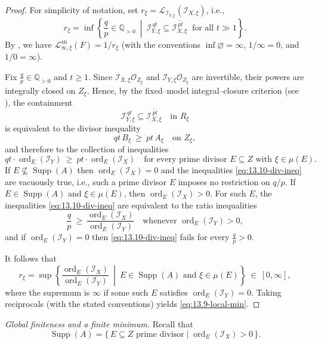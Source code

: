 \documentclass[12pt]{amsart}
\newcommand{\QQ}{\mathbb{Q}}
\newcommand{\Supp}{\operatorname{\mathrm{Supp}}}
\newcommand{\ord}{\operatorname{\mathrm{ord}}}
\newcommand{\cO}{\mathcal{O}}
\newcommand{\Loj}{\mathcal{L}} %
\theoremstyle{plain}
\theoremstyle{definition}
\numberwithin{equation}{section}
\begin{document}
\begin{proof}
	For simplicity of notation, set $r_\xi = \Loj_{\mathscr I_{Y,\xi}}(\mathscr I_{X,\xi})$, i.e.,
	\[
	r_\xi =\inf\left\{\frac{q}{p}\in\QQ_{>0}\ \middle|\
	\mathscr I_{Y,\xi}^{\,qt}\subseteq \overline{\mathscr I_{X,\xi}^{\,pt}}\ \text{ for all }t\gg 1\right\}.
	\]
	By , we have $\Loj^{\text{an}}_{\infty,\xi}(F)=1/r_\xi$
	(with the conventions $\inf\varnothing=\infty$, $1/\infty=0$, and $1/0=\infty$).

	Fix $\frac{q}{p}\in\QQ_{>0}$ and $t\ge 1$.
	Since $\mathscr I_{X,\xi}\cO_{Z_\xi}$ and $\mathscr I_{Y,\xi}\cO_{Z_\xi}$ are invertible, their powers are
	integrally closed on $Z_\xi$.
	Hence, by the fixed--model integral--closure criterion (see ),
	the containment
	\[
	\mathscr I_{Y,\xi}^{\,qt}\subseteq \overline{\mathscr I_{X,\xi}^{\,pt}}
	\quad\text{in }R_\xi
	\]
	is equivalent to the divisor inequality
	\[
	qt\,B_\xi \ \ge\ pt\,A_\xi
	\quad\text{on }Z_\xi,
	\]
	and therefore to the collection of inequalities
	\begin{equation}\label{eq:13.10-div-ineq}
		qt\cdot \ord_E(\mathscr I_Y)\ \ge\ pt\cdot \ord_E(\mathscr I_X)
		\quad\text{for every prime divisor }E\subseteq Z\text{ with }\xi\in\mu(E).
	\end{equation}
	If $E \not\subseteq \Supp(A)$ then $\ord_E(\mathscr I_X) = 0$ and the inequalities \eqref{eq:13.10-div-ineq} are vacuously true, i.e., such a prime divisor $E$ imposes no restriction on $q/p$. If $E\in \Supp(A)$ and $\xi\in\mu(E)$, then $\ord_E(\mathscr I_X)>0$.
	For such $E$, the inequalities \eqref{eq:13.10-div-ineq} are equivalent to the ratio inequalities
	\[
	\frac{q}{p}\ \ge\ \frac{\ord_E(\mathscr I_X)}{\ord_E(\mathscr I_Y)}
	\quad\text{whenever }\ord_E(\mathscr I_Y)>0,
	\]
	and if $\ord_E(\mathscr I_Y)=0$ then \eqref{eq:13.10-div-ineq} fails for every $\frac{q}{p}>0$.

	It follows that
	\[
	r_\xi
	=
	\sup\left\{
	\frac{\ord_E(\mathscr I_X)}{\ord_E(\mathscr I_Y)}
	\ \middle|\
	E\in \Supp(A)\text{ and }\xi\in \mu(E)
	\right\}
	\ \in\ [0,\infty],
	\]
	where the supremum is $\infty$ if some such $E$ satisfies $\ord_E(\mathscr I_Y)=0$.
	Taking reciprocals (with the stated conventions) yields \eqref{eq:13.9-local-min}.
\end{proof}

\smallskip
\noindent\textit{Global finiteness and a finite minimum.}
Recall that
\[
\Supp(A)=\{\,E\subseteq Z \text{ prime divisor}\mid \ord_E(\mathscr I_X)>0\,\}.
\]
\end{document}

